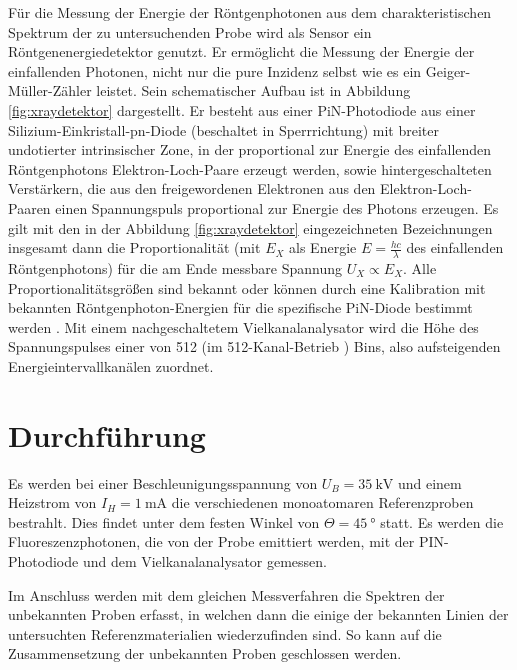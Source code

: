 Für die Messung der Energie der Röntgenphotonen aus dem charakteristischen Spektrum der zu untersuchenden Probe wird als Sensor ein Röntgenenergiedetektor genutzt. Er ermöglicht die Messung der Energie der einfallenden Photonen, nicht nur die pure Inzidenz selbst wie es ein Geiger-Müller-Zähler leistet. Sein schematischer Aufbau ist in Abbildung \ref{fig:xraydetektor} dargestellt. Er besteht aus einer PiN-Photodiode aus einer Silizium-Einkristall-pn-Diode (beschaltet in Sperrrichtung) mit breiter undotierter intrinsischer Zone, in der proportional zur Energie des einfallenden Röntgenphotons Elektron-Loch-Paare erzeugt werden, sowie hintergeschalteten Verstärkern, die aus den freigewordenen Elektronen aus den Elektron-Loch-Paaren einen Spannungspuls proportional zur Energie des Photons erzeugen. Es gilt mit den in der Abbildung \ref{fig:xraydetektor} eingezeichneten Bezeichnungen insgesamt dann die Proportionalität (mit $E_X$ als Energie $E=\frac{hc}{\lambda}$ des einfallenden Röntgenphotons) für die am Ende messbare Spannung $U_X \propto E_X $. Alle Proportionalitätsgrößen sind bekannt oder können durch eine Kalibration mit bekannten Röntgenphoton-Energien für die spezifische PiN-Diode bestimmt werden \cite{LDkalibration}.
Mit einem nachgeschaltetem Vielkanalanalysator wird die Höhe des Spannungspulses einer von 512 (im 512-Kanal-Betrieb \cite{Versuchsanleitung428}) Bins, also aufsteigenden Energieintervallkanälen zuordnet.




\section{Durchführung}
Es werden bei einer Beschleunigungsspannung von $U_B = \SI{35}{\kilo\volt}$ und einem Heizstrom von $I_H = \SI{1}{\milli\ampere}$ die verschiedenen monoatomaren Referenzproben bestrahlt. Dies findet unter dem festen Winkel von $\Theta = \SI{45}{\degree}$ statt. Es werden die Fluoreszenzphotonen, die von der Probe emittiert werden, mit der PIN-Photodiode und dem Vielkanalanalysator gemessen\cite{Versuchsanleitung428}.

Im Anschluss werden mit dem gleichen Messverfahren die Spektren der unbekannten Proben erfasst, in welchen dann die einige der bekannten Linien der untersuchten Referenzmaterialien wiederzufinden sind. So kann auf die Zusammensetzung der unbekannten Proben geschlossen werden.

